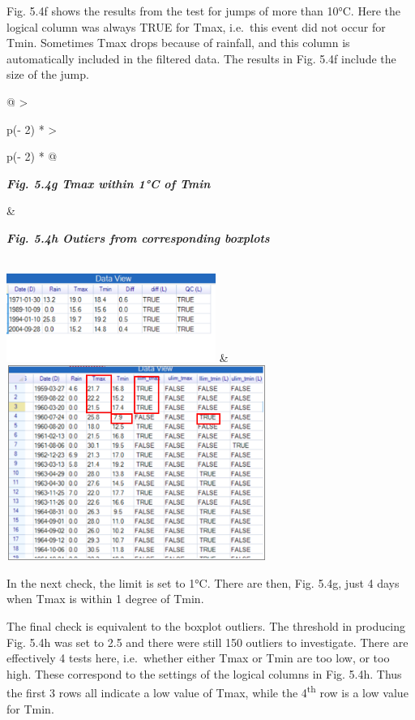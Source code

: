 \documentclass[
  letterpaper,
  DIV=11,
  numbers=noendperiod]{scrreprt}
\begin{document}
Fig. 5.4f shows the results from the test for jumps of more than 10°C.
Here the logical column was always TRUE for Tmax, i.e.~this event did
not occur for Tmin. Sometimes Tmax drops because of rainfall, and this
column is automatically included in the filtered data. The results in
Fig. 5.4f include the size of the jump.

\begin{longtable}[]{@{}
  >{\raggedright\arraybackslash}p{(\columnwidth - 2\tabcolsep) * }
  >{\raggedright\arraybackslash}p{(\columnwidth - 2\tabcolsep) * }@{}}
\toprule\noalign{}
\begin{minipage}[b]{\linewidth}\raggedright
\textbf{\emph{Fig. 5.4g Tmax within 1°C of Tmin}}
\end{minipage} & \begin{minipage}[b]{\linewidth}\raggedright
\textbf{\emph{Fig. 5.4h Outiers from corresponding boxplots}}
\end{minipage} \\
\midrule\noalign{}
\endhead
\bottomrule\noalign{}
\endlastfoot
\includegraphics[width=2.68755in,height=1.13204in]{figures/Fig5.4g.png}
&
\includegraphics[width=3.33483in,height=2.49906in]{figures/Fig5.4h.png} \\
\end{longtable}

In the next check, the limit is set to 1°C. There are then, Fig. 5.4g,
just 4 days when Tmax is within 1 degree of Tmin.

The final check is equivalent to the boxplot outliers. The threshold in
producing Fig. 5.4h was set to 2.5 and there were still 150 outliers to
investigate. There are effectively 4 tests here, i.e.~whether either
Tmax or Tmin are too low, or too high. These correspond to the settings
of the logical columns in Fig. 5.4h. Thus the first 3 rows all indicate
a low value of Tmax, while the 4\textsuperscript{th} row is a low value
for Tmin.
\end{document}
